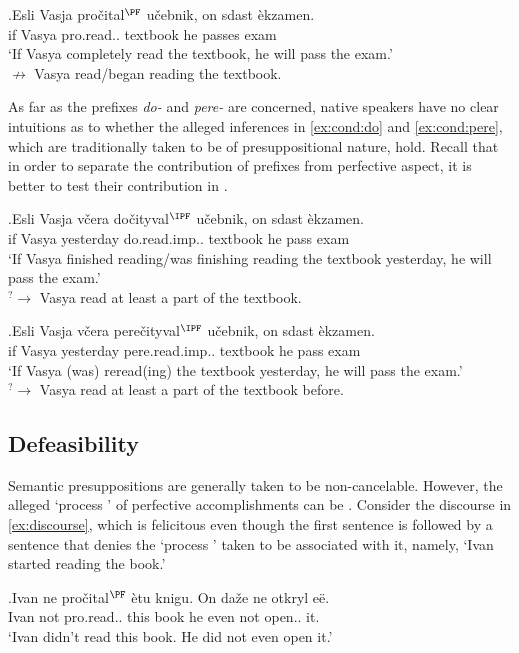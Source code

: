 \exg.\label{ex:cond}Esli Vasja pro\v{c}ital$^{\PF}$ u\v{c}ebnik, on sdast \`{e}kzamen.\\
if Vasya pro.read.. textbook he passes exam\\
\trans `If Vasya completely read the textbook, he will pass the exam.'\\
$\nrightarrow$ Vasya read/began reading the textbook.

As far as the prefixes \textit{do-} and \textit{pere-} are concerned, native speakers have no clear intuitions as to whether the alleged inferences in \ref{ex:cond:do} and \ref{ex:cond:pere}, which are traditionally taken to be of presuppositional nature, hold. Recall that in order to separate the contribution of prefixes from perfective aspect, it is better to test their contribution in .

\exg.\label{ex:cond:do}Esli Vasja v\v{c}era do\v{c}ityval$^{\IPF}$ u\v{c}ebnik, on sdast \`{e}kzamen.\\
if Vasya yesterday do.read.imp.. textbook he pass exam\\
\trans `If Vasya finished reading/was finishing reading the textbook yesterday, he will pass the exam.'\\
$^?\rightarrow$ Vasya read at least a part of the textbook.

\exg.\label{ex:cond:pere}Esli Vasja v\v{c}era pere\v{c}ityval$^{\IPF}$ u\v{c}ebnik, on sdast \`{e}kzamen.\\
if Vasya yesterday pere.read.imp.. textbook he pass exam\\
\trans `If Vasya (was) reread(ing) the textbook yesterday, he will pass the exam.'\\
$^?\rightarrow$ Vasya read at least a part of the textbook before.


\subsection{Defeasibility}
Semantic presuppositions are generally taken to be non-cancelable. However, the alleged `process ' of perfective accomplishments can be . Consider the discourse in \ref{ex:discourse}, which is felicitous even though the first sentence is followed by a sentence that denies the `process ' taken to be associated with it, namely, `Ivan started reading the book.'

\exg.\label{ex:discourse}Ivan ne pro\v{c}ital$^{\PF}$ \`{e}tu knigu. On da\v{z}e ne otkryl e\"{e}.\\
Ivan not pro.read.. this book he even not open.. it.\\
\trans `Ivan didn't read this book. He did not even open it.'

